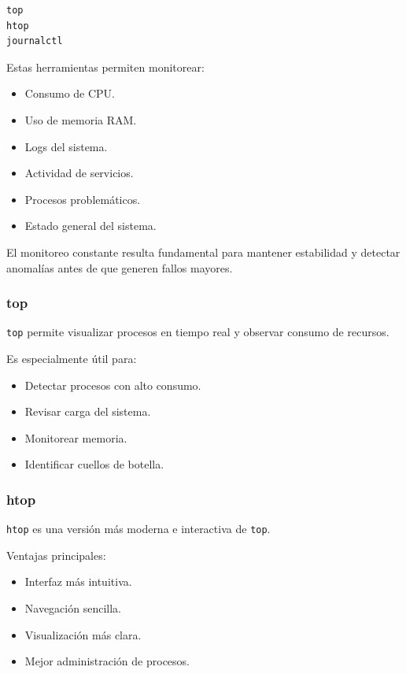 \documentclass[11pt, letterpaper]{article}
\begin{document}
\begin{verbatim}
top
htop
journalctl
\end{verbatim}

Estas herramientas permiten monitorear:

\begin{itemize}
\item Consumo de CPU.
\item Uso de memoria RAM.
\item Logs del sistema.
\item Actividad de servicios.
\item Procesos problemáticos.
\item Estado general del sistema.
\end{itemize}

El monitoreo constante resulta fundamental para mantener estabilidad y detectar anomalías antes de que generen fallos mayores.
\subsubsection{top}
\label{sec:org73c4f34}

\texttt{top} permite visualizar procesos en tiempo real y observar consumo de recursos.

Es especialmente útil para:

\begin{itemize}
\item Detectar procesos con alto consumo.
\item Revisar carga del sistema.
\item Monitorear memoria.
\item Identificar cuellos de botella.
\end{itemize}
\subsubsection{htop}
\label{sec:orgde0f1c6}

\texttt{htop} es una versión más moderna e interactiva de \texttt{top}.

Ventajas principales:

\begin{itemize}
\item Interfaz más intuitiva.
\item Navegación sencilla.
\item Visualización más clara.
\item Mejor administración de procesos.
\end{itemize}
\end{document}
